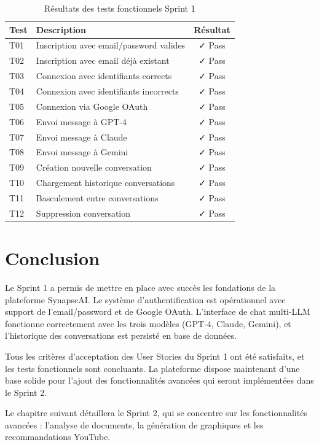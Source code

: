 \begin{table}[H]
\centering
\caption{Résultats des tests fonctionnels Sprint 1}
\label{tab:tests-sprint1}
\begin{tabular}{|l|p{6cm}|c|}
\hline
\textbf{Test} & \textbf{Description} & \textbf{Résultat} \\
\hline
T01 & Inscription avec email/password valides & ✓ Pass \\
\hline
T02 & Inscription avec email déjà existant & ✓ Pass \\
\hline
T03 & Connexion avec identifiants corrects & ✓ Pass \\
\hline
T04 & Connexion avec identifiants incorrects & ✓ Pass \\
\hline
T05 & Connexion via Google OAuth & ✓ Pass \\
\hline
T06 & Envoi message à GPT-4 & ✓ Pass \\
\hline
T07 & Envoi message à Claude & ✓ Pass \\
\hline
T08 & Envoi message à Gemini & ✓ Pass \\
\hline
T09 & Création nouvelle conversation & ✓ Pass \\
\hline
T10 & Chargement historique conversations & ✓ Pass \\
\hline
T11 & Basculement entre conversations & ✓ Pass \\
\hline
T12 & Suppression conversation & ✓ Pass \\
\hline
\end{tabular}
\end{table}

\section{Conclusion}

Le Sprint 1 a permis de mettre en place avec succès les fondations de la plateforme SynapseAI. Le système d'authentification est opérationnel avec support de l'email/password et de Google OAuth. L'interface de chat multi-LLM fonctionne correctement avec les trois modèles (GPT-4, Claude, Gemini), et l'historique des conversations est persisté en base de données.

Tous les critères d'acceptation des User Stories du Sprint 1 ont été satisfaits, et les tests fonctionnels sont concluants. La plateforme dispose maintenant d'une base solide pour l'ajout des fonctionnalités avancées qui seront implémentées dans le Sprint 2.

Le chapitre suivant détaillera le Sprint 2, qui se concentre sur les fonctionnalités avancées : l'analyse de documents, la génération de graphiques et les recommandations YouTube.

